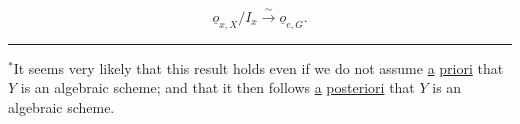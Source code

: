 \[
\underline{o}_{x,X}/I_x\xrightarrow{\sim}\underline{o}_{e,G}.
\]


\noindent\rule{2cm}{.4pt}

\({}^*\)It seems very likely that this result holds even if we do not assume \uline{a} \uline{priori} that $Y$ is an algebraic scheme; and that it then follows \uline{a} \uline{posteriori} that $Y$ is an algebraic scheme.

